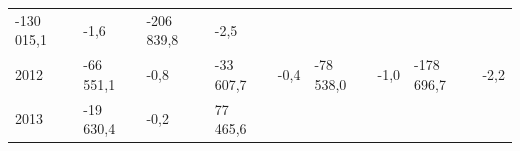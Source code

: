 \begin{longtable}[]{@{}lllllllll@{}}
\begin{minipage}[t]{0.12\columnwidth}
-130 015,1\strut
\end{minipage} & \begin{minipage}[t]{0.06\columnwidth}\raggedright
-1,6\strut
\end{minipage} & \begin{minipage}[t]{0.09\columnwidth}\raggedright
-206 839,8\strut
\end{minipage} & \begin{minipage}[t]{0.06\columnwidth}\raggedright
-2,5\strut
\end{minipage}\tabularnewline
\begin{minipage}[t]{0.05\columnwidth}\raggedright
2012\strut
\end{minipage} & \begin{minipage}[t]{0.10\columnwidth}\raggedright
-66 551,1\strut
\end{minipage} & \begin{minipage}[t]{0.06\columnwidth}\raggedright
-0,8\strut
\end{minipage} & \begin{minipage}[t]{0.16\columnwidth}\raggedright
-33 607,7\strut
\end{minipage} & \begin{minipage}[t]{0.06\columnwidth}\raggedright
-0,4\strut
\end{minipage} & \begin{minipage}[t]{0.12\columnwidth}\raggedright
-78 538,0\strut
\end{minipage} & \begin{minipage}[t]{0.06\columnwidth}\raggedright
-1,0\strut
\end{minipage} & \begin{minipage}[t]{0.09\columnwidth}\raggedright
-178 696,7\strut
\end{minipage} & \begin{minipage}[t]{0.06\columnwidth}\raggedright
-2,2\strut
\end{minipage}\tabularnewline
\begin{minipage}[t]{0.05\columnwidth}\raggedright
2013\strut
\end{minipage} & \begin{minipage}[t]{0.10\columnwidth}\raggedright
-19 630,4\strut
\end{minipage} & \begin{minipage}[t]{0.06\columnwidth}\raggedright
-0,2\strut
\end{minipage} & \begin{minipage}[t]{0.16\columnwidth}\raggedright
77 465,6\strut

\end{minipage}
\end{longtable}
